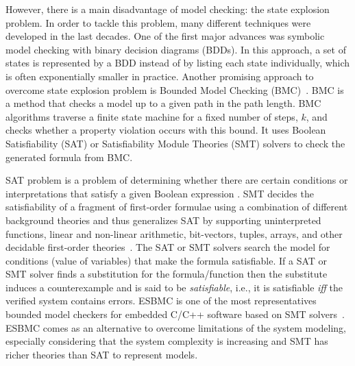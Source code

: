 \documentclass[journal]{IEEEtran}
\begin{document}
However, there is a main disadvantage of model checking: the state explosion problem. In order to tackle this problem, many different techniques were developed in the last decades. One of the first major advances was symbolic model checking with binary decision diagrams (BDDs). In this approach, a set of states is represented by a BDD instead of by listing each state individually, which is often exponentially smaller in practice.
%
Another promising approach to overcome state explosion problem is Bounded Model Checking (BMC)~\cite{DBLP:conf/tacas/BiereCCZ99}. BMC is a method that checks a model up to a given path in the path length. BMC algorithms traverse a finite state machine for a fixed number of steps, $ k $, and checks whether a property violation occurs with this bound. It uses Boolean Satisfiability (SAT) or Satisfiability Module Theories (SMT) solvers to check the generated formula from BMC. 

SAT problem is a problem of determining whether there are certain conditions or interpretations that satisfy a given Boolean expression \cite{ClarkeHV18}. 
SMT decides the satisfiability of a fragment of first-order formulae using a combination of different background theories and thus generalizes SAT by supporting uninterpreted functions, linear and non-linear arithmetic, bit-vectors, tuples, arrays, and other decidable first-order theories~\cite{ClarkeHV18}.
The SAT or SMT solvers search the model for conditions (value of variables) that make the formula satisfiable. If a SAT or SMT solver finds a substitution for the formula/function then the substitute induces a counterexample and is said to be \textit{satisfiable}, i.e., it is satisfiable \textit{iff} the verified system contains errors.  
%
%
%
ESBMC is one of the most representatives bounded model checkers for embedded C/C++ software based on SMT solvers~\cite{esbmc2018}. %
ESBMC comes as an alternative to overcome limitations of the system modeling, especially considering that the system complexity is increasing and SMT has richer theories than SAT to represent models. 
\end{document}
